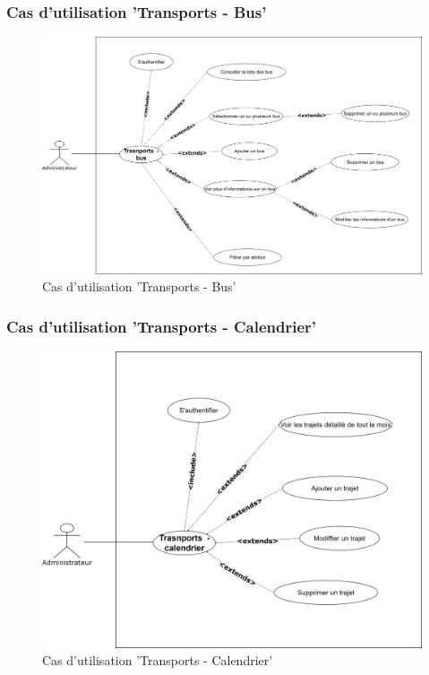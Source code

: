 \subsubsection*{Cas d'utilisation 'Transports - Bus'}
\begin{figure}[H]
    \centering
    \includegraphics[scale=0.1]{ACR/Diagrammes/Transports - bus.jpg}
    \caption{Cas d'utilisation 'Transports - Bus'}
\end{figure}

\subsubsection*{Cas d'utilisation 'Transports - Calendrier'}
\begin{figure}[H]
    \centering
    \includegraphics[scale=0.1]{ACR/Diagrammes/Transports - calendrier.jpg}
    \caption{Cas d'utilisation 'Transports - Calendrier'}
\end{figure}

